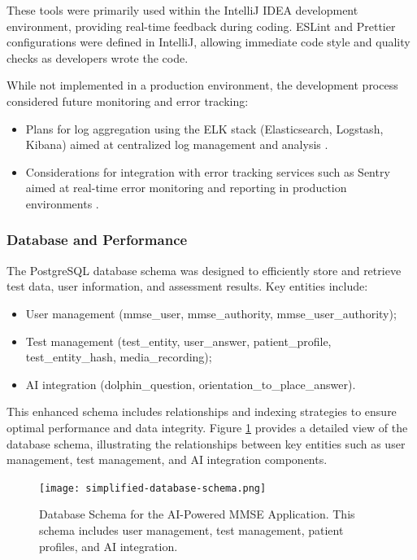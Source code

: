 These tools were primarily used within the IntelliJ IDEA development environment, providing real-time feedback during coding. ESLint and Prettier configurations were defined in IntelliJ, allowing immediate code style and quality checks as developers wrote the code.

While not implemented in a production environment, the development process considered future monitoring and error tracking:
\begin{itemize}
\item Plans for log aggregation using the ELK stack (Elasticsearch, Logstash, Kibana) aimed at centralized log management and analysis \cite{elk}.
\item Considerations for integration with error tracking services such as Sentry aimed at real-time error monitoring and reporting in production environments \cite{sentry}.
\end{itemize}

\subsubsection{Database and Performance}
The PostgreSQL database schema was designed to efficiently store and retrieve test data, user information, and assessment results. Key entities include:
\begin{itemize}
    \item User management (mmse\_user, mmse\_authority, mmse\_user\_authority);
    \item Test management (test\_entity, user\_answer, patient\_profile, test\_entity\_hash, media\_recording);
    \item AI integration (dolphin\_question, orientation\_to\_place\_answer).
\end{itemize}

This enhanced schema includes relationships and indexing strategies to ensure optimal performance and data integrity. Figure \ref{fig:database-schema} provides a detailed view of the database schema, illustrating the relationships between key entities such as user management, test management, and AI integration components.

\begin{figure}[h!]
\begin{center}
\texttt{[image: simplified-database-schema.png]}
\caption{Database Schema for the AI-Powered MMSE Application. This schema includes user management, test management, patient profiles, and AI integration.}
\label{fig:database-schema}
\end{center}
\end{figure}

